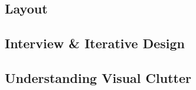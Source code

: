 




\subsection{Layout}

\subsection{Interview \& Iterative Design}

\subsection{Understanding Visual Clutter}
